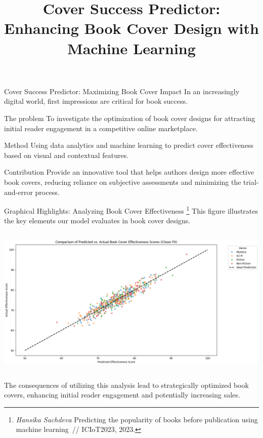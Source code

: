\documentclass[11pt,pdf,hyperref={unicode}]{beamer}
\title{Cover Success Predictor: Enhancing Book Cover Design with Machine Learning}
\begin{document}
    \setcounter{page}{2}%
    \begin{frame}{Cover Success Predictor: Maximizing Book Cover Impact}
        In an increasingly digital world, first impressions are critical for book success.

        \begin{block}{The problem}
            To investigate the optimization of book cover designs for attracting initial reader engagement in a competitive online marketplace.
        \end{block}
        \begin{block}{Method}
            Using data analytics and machine learning to predict cover effectiveness based on visual and contextual features.
        \end{block}
        \begin{block}{Contribution}
            Provide an innovative tool that helps authors design more effective book covers, reducing reliance on subjective assessments and minimizing the trial-and-error process.
        \end{block}
    \end{frame}
    \begin{frame}{Graphical Highlights: Analyzing Book Cover Effectiveness%
    \footnote{\textit{Hansika Sachdeva} Predicting the popularity of books before publication using machine learning~// ICIoT2023, 2023.}}
        This figure illustrates the key elements our model evaluates in book cover designs.
        \begin{columns}
            \begin{column}{0.8\textwidth}
                \includegraphics[width=1\textwidth]{Name-Step-3-fig}
            \end{column}
        \end{columns}
        \bigskip
        The consequences of utilizing this analysis lead to strategically optimized book covers, enhancing initial reader engagement and potentially increasing sales.
    \end{frame}
\end{document}

